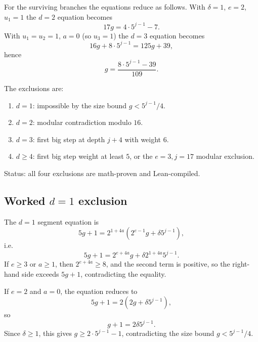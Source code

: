 For the surviving branches the equations reduce as follows.  With
$\delta=1$, $e=2$, $u_1=1$ the $d=2$ equation becomes
\begin{equation*}
  17g=4\cdot5^{j-1}-7.
\end{equation*}
With $u_1=u_2=1$, $a=0$ (so $u_3=1$) the $d=3$ equation becomes
\begin{equation*}
  16g+8\cdot5^{j-1}=125g+39,
\end{equation*}
hence
\begin{equation*}
  g=\frac{8\cdot5^{j-1}-39}{109}.
\end{equation*}

The exclusions are:
\begin{enumerate}[leftmargin=*]
\item $d=1$: impossible by the size bound $g<5^{j-1}/4$.
\item $d=2$: modular contradiction modulo $16$.
\item $d=3$: first big step at depth $j+4$ with weight $6$.
\item $d\ge4$: first big step weight at least $5$, or the
  $e=3,j=17$ modular exclusion.
\end{enumerate}

Status: all four exclusions are math-proven and Lean-compiled.

\subsection{Worked $d=1$ exclusion}

The $d=1$ segment equation is
\begin{equation*}
  5g+1=2^{1+4a}\left(2^{e-1}g+\delta5^{j-1}\right),
\end{equation*}
i.e.
\begin{equation*}
  5g+1=2^{e+4a}g+\delta2^{1+4a}5^{j-1}.
\end{equation*}
If $e\ge3$ or $a\ge1$, then $2^{e+4a}\ge8$, and the second term is
positive, so the right-hand side exceeds $5g+1$, contradicting the
equality.

If $e=2$ and $a=0$, the equation reduces to
\begin{equation*}
  5g+1=2\left(2g+\delta5^{j-1}\right),
\end{equation*}
so
\begin{equation*}
  g+1=2\delta5^{j-1}.
\end{equation*}
Since $\delta\ge1$, this gives $g\ge2\cdot5^{j-1}-1$, contradicting
the size bound $g<5^{j-1}/4$.

